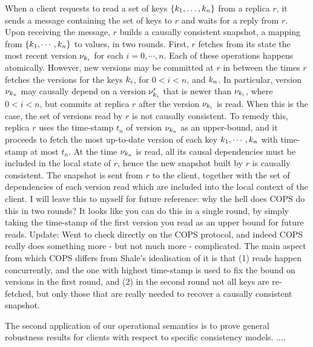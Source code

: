 When a client requests to read a set of keys \( \{k_1, \dots,
k_n\} \) from a  replica $r$, it sends a message 
containing the set of keys to $r$ and waits for a reply from $r$. Upon receiving the message, $r$ builds a causally consistent snapshot, \ie
a mapping from $\{k_{1},\cdots, k_{n}\}$ to values, in two rounds. 
First, $r$ fetches from its state 
the most recent version \( \nu_{k_i} \) for each $i
{=} 0,\cdots,n$. Each of these operations happens atomically. However, 
new versions may be committed at $r$ in between the times $r$ fetches the versions for the keys 
$k_{i}$, for $0 < i < n$,  and $k_{n}$. In particular, version $\nu_{k_{n}}$ may causally depend
on a version $\nu'_{k_{i}}$ that is newer than $\nu_{k_{i}}$,  where $0 < i < n$, but commits at replica $r$ 
after the version $\nu_{k_{i}}$ is read. When this is the case, the set of versions read by $r$ is not causally consistent. 
To remedy this, replica $r$ uses the time-stamp $t_{n}$ of version $\nu_{k_{n}}$ as an upper-bound, 
and it proceeds to fetch the most up-to-date version of each key $k_{1}, \cdots, k_{n}$ with time-stamp 
at most $t_{n}$. At the time $\nu_{k_{n}}$ is read,  all its causal dependencies must be included in the local 
state of $r$, hence the new snapshot built by $r$ is causally consistent. The snapshot is sent  from $r$ 
to the client, together with the set of dependencies of each version
read which are 
included into the local context of the client.
\ac{I will leave this to myself for future reference: why the hell does COPS do this in two rounds? It looks like you can do 
this in a single round, by simply taking the time-stamp of the first version you read as an upper bound for future reads.
Update: Went to check directly on the COPS protocol, and indeed COPS really does something more - but not much more - complicated. 
The main aspect from which COPS differs from Shale's idealisation of it is that (1) reads happen concurrently, and the 
one with highest time-stamp is used to fix the bound on versions in the first round, and (2) in the second round not all keys 
are re-fetched, but only those that are really needed to recover a causally consistent snapshot.}


The second application of our operational semantics is to prove
general robustness results for clients with respect to specific
consistency models. ....

